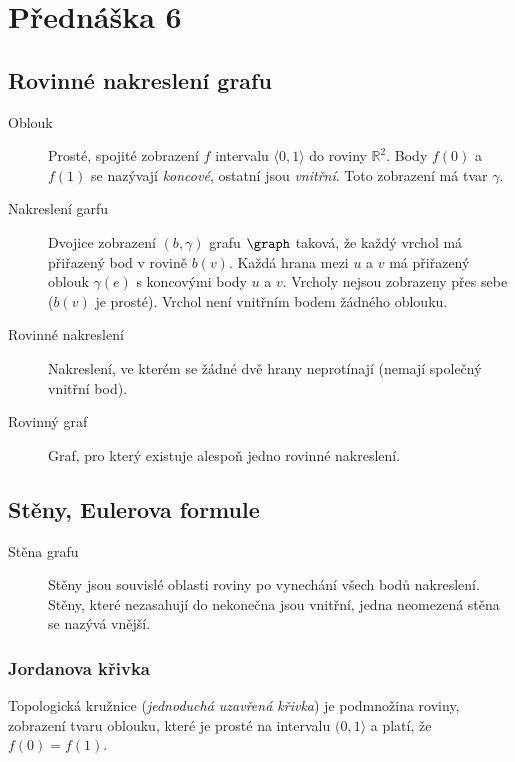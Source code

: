 \section{Přednáška 6}

\subsection{Rovinné nakreslení grafu}

\begin{description}
    \item[Oblouk] Prosté, spojité zobrazení $f$ intervalu \(\langle 0, 1 \rangle\) do roviny $\mathbb{R}^2$.
    Body $f(0)$ a $f(1)$ se nazývají \textit{koncové}, ostatní jsou \textit{vnitřní}.
    Toto zobrazení má tvar $\gamma$.
    \item[Nakreslení garfu] Dvojice zobrazení $(b, \gamma)$ grafu $\graph$ taková, že každý vrchol má přiřazený bod v rovině $b(v)$.
    Každá hrana mezi $u$ a $v$ má přiřazený oblouk $\gamma(e)$ s koncovými body $u$ a $v$.
    Vrcholy nejsou zobrazeny přes sebe ($b(v)$ je prosté).
    Vrchol není vnitřním bodem žádného oblouku.
    \item[Rovinné nakreslení] Nakreslení, ve kterém se žádné dvě hrany neprotínají (nemají společný vnitřní bod).
    \item[Rovinný graf] Graf, pro který existuje alespoň jedno rovinné nakreslení.
\end{description}

\subsection{Stěny, Eulerova formule}

\begin{description}
    \item[Stěna grafu] Stěny jsou souvislé oblasti roviny po vynechání všech bodů nakreslení.
    Stěny, které nezasahují do nekonečna jsou vnitřní, jedna neomezená stěna se nazývá vnější.
\end{description}

\subsubsection{Jordanova křivka}

Topologická kružnice (\textit{jednoduchá uzavřená křivka}) je podmnožina roviny, zobrazení tvaru oblouku, které je prosté na intervalu $(0, 1\rangle$ a platí, že $f(0) = f(1)$.


